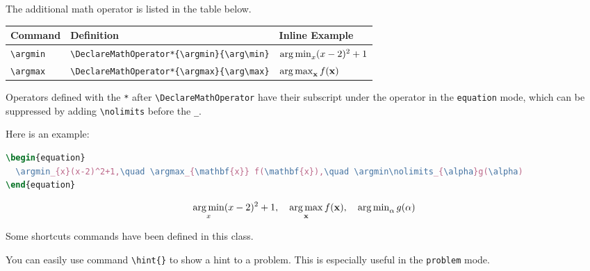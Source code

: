 \documentclass[twoside]{seu-ml-assign}
\newcommand{\grayrow}{\rowcolor[rgb]{ .906,  .902,  .902}}
\begin{document}
     The additional math operator is listed in the table below.
    \begin{table}[htbp]
      \begin{threeparttable}
        \bgroup
          \def\arraystretch{1.2}
          \setlength{\tabcolsep}{1.5em}
          \begin{tabular}{lll}
          \toprule
            \textbf{Command} & \textbf{Definition} & \textbf{Inline Example} \\
            \midrule\midrule
            \grayrow \verb|\argmin| & \verb|\DeclareMathOperator*{\argmin}{\arg\min}| & $\argmin_{x}(x-2)^2+1$ \\
            \verb|\argmax| & \verb|\DeclareMathOperator*{\argmax}{\arg\max}| & $\argmax_{\mathbf{x}} f(\mathbf{x})$ \\
          \bottomrule
          \end{tabular}%
          \begin{tablenotes}\footnotesize
            \item Operators defined with the \texttt{*} after \verb|\DeclareMathOperator| have their subscript under the operator in the \texttt{equation} mode, which can be suppressed by adding \verb|\nolimits| before the \verb|_|.
          \end{tablenotes}
        \egroup
      \end{threeparttable}
    \end{table}

    Here is an example:
    \begin{lstlisting}[language=tex,numbers=none,morekeywords={begin}]
\begin{equation}
  \argmin_{x}(x-2)^2+1,\quad \argmax_{\mathbf{x}} f(\mathbf{x}),\quad \argmin\nolimits_{\alpha}g(\alpha)
\end{equation}
    \end{lstlisting}
    \begin{equation}
      \argmin_{x}(x-2)^2+1,\quad \argmax_{\mathbf{x}} f(\mathbf{x}),\quad \argmin\nolimits_{\alpha}g(\alpha)
    \end{equation}

     Some shortcuts commands have been defined in this class.

      \label{subsubsec:hint}
      You can easily use command \verb|\hint{}| to show a hint to a problem.
      This is especially useful in the \texttt{problem} mode.
\end{document}

